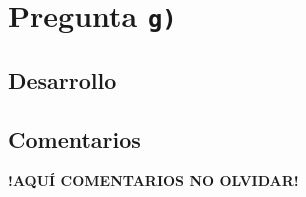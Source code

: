 \section{Pregunta \texttt{g)}}\label{pregunta-g}

\subsection{Desarrollo}

\FloatBarrier
\subsection{Comentarios}


\textbf{!AQUÍ COMENTARIOS NO OLVIDAR!}
